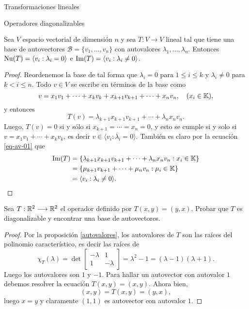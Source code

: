 \begin{chapter}{Transformaciones lineales}
\begin{section}{Operadores diagonalizables}
        \begin{proposicion} Sea $V$ espacio vectorial de dimensión $n$ y sea $T: V \to V$ lineal tal que tiene una base de autovectores $\mathcal{B} = \{v_1,\ldots,v_n \}$  con autovalores $\lambda_1,\ldots,\lambda_n$. Entonces $\operatorname{Nu}(T)=\langle v_i: \lambda_i =0 \rangle$ e  $\operatorname{Im}(T)=\langle v_i: \lambda_i \not=0 \rangle$.			
        \end{proposicion}
        \begin{proof} Reordenemos la base de tal forma que  $\lambda_i =0$ para $1 \le i \le k$ y $\lambda_i \ne 0$ para $k < i \le n$. 
        Todo $v \in V$ se escribe en términos de la base como 
        $$
        v = x_1v_1 + \cdots+ x_k v_k+ x_{k+1} v_{k+1}+\cdots+ x_n v_n,\quad (x_i \in \mathbb K),
        $$
        y entonces
        \begin{equation}\label{eq-av-01}
            T(v) =  \lambda_{k+1}x_{k+1} v_{k+1}+\cdots+ \lambda_nx_n v_n.
        \end{equation}
        Luego, $T(v) =0$ si y sólo si $x_{k+1} = \cdots = x_n=0$, y esto se cumple si y solo si $v =  x_1v_1 + \cdots+ x_k v_k$,  es decir $v \in \langle v_i: \lambda_i =0 \rangle$. 
        También es claro por la ecuación \eqref{eq-av-01} que 
        \begin{align*}
            \operatorname{Im}(T) &= \{\lambda_{k+1}x_{k+1} v_{k+1}+\cdots+ \lambda_nx_n v_n: x_i \in \mathbb K \} \\
            &=\{\mu_{k+1} v_{k+1}+\cdots+ \mu_n v_n: \mu_i \in \mathbb K \}\\
            &= \langle v_i: \lambda_i \not=0 \rangle.
        \end{align*}
        \end{proof}
        
        \begin{ejemplo*}
            Sea $T:\mathbb R^2 \longrightarrow \mathbb R^2$ el operador definido por $T(x,y)=(y,x)$. Probar que $T$ es diagonalizable y encontrar una base de autovectores. 
        \end{ejemplo*}
        \begin{proof}
            Por la proposición \ref{autovalores}, los autovalores de $T$  son las raíces del polinomio característico,  es decir las raíces de 
            $$
            \chi_T(\lambda)= \det\left[\begin{matrix}
            -\lambda& 1 \\ 1 & -\lambda
            \end{matrix} \right]= \lambda^2 -1  =(\lambda -1)(\lambda +1). 
            $$
            Luego los autovalores son $1$ y $-1$. Para hallar un autovector con autovalor $1$ debemos resolver la ecuación $T(x,y) = (x,y)$. Ahora bien, 
            $$
            (x,y) = T(x,y) = (y,x),
            $$
            luego $x =y$ y claramente $(1,1)$ es autovector con autovalor $1$.
            

\end{proof}
\end{section}
\end{chapter}
